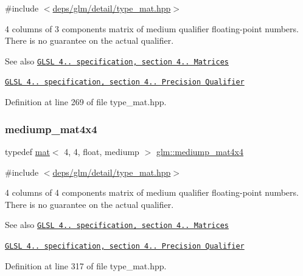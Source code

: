 {\ttfamily \#include $<$\hyperlink{type__mat_8hpp}{deps/glm/detail/type\+\_\+mat.\+hpp}$>$}

4 columns of 3 components matrix of medium qualifier floating-\/point numbers. There is no guarantee on the actual qualifier.

\begin{DoxySeeAlso}{See also}
\href{http://www.opengl.org/registry/doc/GLSLangSpec.4.20.8.pdf}{\tt G\+L\+SL 4.. specification, section 4.. Matrices} 

\href{http://www.opengl.org/registry/doc/GLSLangSpec.4.20.8.pdf}{\tt G\+L\+SL 4.. specification, section 4.. Precision Qualifier} 
\end{DoxySeeAlso}


Definition at line 269 of file type\+\_\+mat.\+hpp.

\mbox{\label{group__core__precision_ga80dd7aaae2879e86a588c36a39652ee4}} 
\subsubsection{\texorpdfstring{mediump\+\_\+mat4x4}{mediump\_mat4x4}}
{\footnotesize\ttfamily typedef \hyperlink{structglm_1_1mat}{mat}$<$ 4, 4, float, mediump $>$ \hyperlink{group__core__precision_ga80dd7aaae2879e86a588c36a39652ee4}{glm\+::mediump\+\_\+mat4x4}}



{\ttfamily \#include $<$\hyperlink{type__mat_8hpp}{deps/glm/detail/type\+\_\+mat.\+hpp}$>$}

4 columns of 4 components matrix of medium qualifier floating-\/point numbers. There is no guarantee on the actual qualifier.

\begin{DoxySeeAlso}{See also}
\href{http://www.opengl.org/registry/doc/GLSLangSpec.4.20.8.pdf}{\tt G\+L\+SL 4.. specification, section 4.. Matrices} 

\href{http://www.opengl.org/registry/doc/GLSLangSpec.4.20.8.pdf}{\tt G\+L\+SL 4.. specification, section 4.. Precision Qualifier} 
\end{DoxySeeAlso}


Definition at line 317 of file type\+\_\+mat.\+hpp.

\mbox{\label{group__core__precision_ga08ae38ad78ade3539fdd1d25052b8c51}} 
